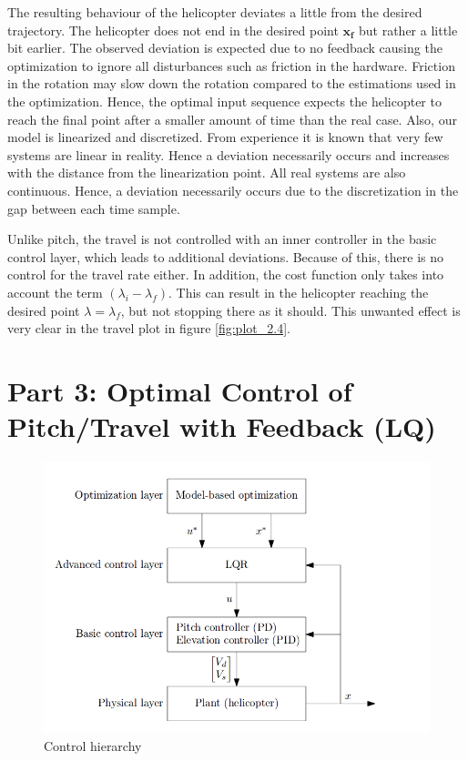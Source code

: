 \documentclass[a4paper, 12pt]{article}\usepackage[utf8]{inputenc}
\begin{document}
The resulting behaviour of the helicopter deviates a little from the desired trajectory. The helicopter does not end in the desired point $\boldsymbol{x_f}$ but rather a little bit earlier. The observed deviation is expected due to no feedback causing the optimization to ignore all disturbances such as friction in the hardware. Friction in the rotation may slow down the rotation compared to the estimations used in the optimization. Hence, the optimal input sequence expects the helicopter to reach the final point after a smaller amount of time than the real case. Also, our model is linearized and discretized. From experience it is known that very few systems are linear in reality. Hence a deviation necessarily occurs and increases with the distance from the linearization point. All real systems are also continuous. Hence, a deviation necessarily occurs due to the discretization in the gap between each time sample. 

Unlike pitch, the travel is not controlled with an inner controller in the basic control layer, which leads to additional deviations. Because of this, there is no control for the travel rate either. In addition, the cost function only takes into account the term $(\lambda_i - \lambda_f)$. This can result in the helicopter reaching the desired point $\lambda = \lambda_f$, but not stopping there as it should. This unwanted effect is very clear in the travel plot in figure \ref{fig:plot_2.4}.





\section{Part 3: Optimal Control of Pitch/Travel with Feedback (LQ)}

\begin{figure}[H]
    \centering
    \includegraphics[width=140mm]{Part3/feedback_to_LQR.png}
    \caption{Control hierarchy }
    \label{fig:chart_3.1}
\end{figure}
\end{document}
